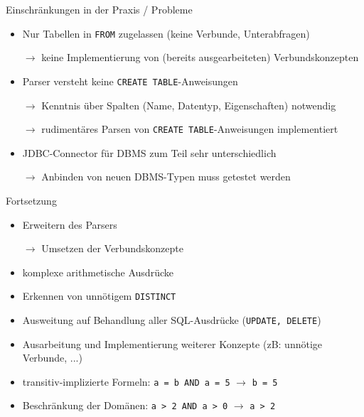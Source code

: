 \documentclass{beamer}
\begin{document}
\begin{frame}[fragile]{Einschränkungen in der Praxis / Probleme}
\begin{itemize}
\item Nur Tabellen in \verb|FROM| zugelassen (keine Verbunde, Unterabfragen)
\item[$\to$] keine Implementierung von (bereits ausgearbeiteten) Verbundskonzepten
\item Parser versteht keine \verb|CREATE TABLE|-Anweisungen
\item[$\to$] Kenntnis über Spalten (Name, Datentyp, Eigenschaften) notwendig
\item[$\to$] rudimentäres Parsen von \verb|CREATE TABLE|-Anweisungen implementiert 
\item JDBC-Connector für DBMS zum Teil sehr unterschiedlich
\item[$\to$] Anbinden von neuen DBMS-Typen muss getestet werden
\end{itemize}

\end{frame}

\begin{frame}[fragile]{Fortsetzung}
\begin{itemize}
\item Erweitern des Parsers 
\item[$\to$] Umsetzen der Verbundskonzepte
\item komplexe arithmetische Ausdrücke
\item Erkennen von unnötigem \verb|DISTINCT|
\item Ausweitung auf Behandlung aller SQL-Ausdrücke (\verb|UPDATE, DELETE|)
\item Ausarbeitung und Implementierung weiterer Konzepte (zB: unnötige Verbunde, ...)
\item transitiv-implizierte Formeln: \verb|a = b AND a = 5| $\to$ \verb|b = 5|
\item Beschränkung der Domänen: \verb|a > 2 AND a > 0| $\to$ \verb|a > 2|
\end{itemize}
\end{frame}

\end{document}
